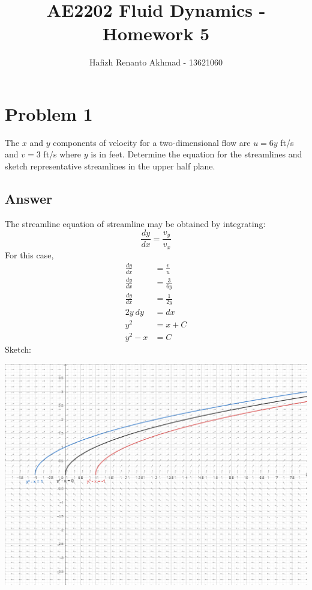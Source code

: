 \documentclass{article}
\title{AE2202 Fluid Dynamics - Homework 5}
\author{Hafizh Renanto Akhmad - 13621060}
\begin{document}
\maketitle

\newpage

\section*{Problem 1}
The $x$ and $y$ components of velocity for a two-dimensional flow are $u = 6y$ ft/s and $v = 3$ ft/s where $y$ is in feet. Determine the equation for the streamlines and sketch representative streamlines in the upper half plane.

\subsection*{Answer}
The streamline equation of streamline may be obtained by integrating:
\begin{equation}
    \frac{dy}{dx} = \frac{v_y}{v_x}
\end{equation}
For this case,
\begin{align*}
    \frac{dy}{dx} &= \frac{v}{u} \\
    \frac{dy}{dx} &= \frac{3}{6y} \\
    \frac{dy}{dx} &= \frac{1}{2y} \\
    2y\ dy &= dx \\
    y^2 &= x + C \\
    y^2 - x &= C
\end{align*}
Sketch:
\begin{center}
    \includegraphics[scale=1.2]{Answer1.jpg}
\end{center}
\newpage
\end{document}
